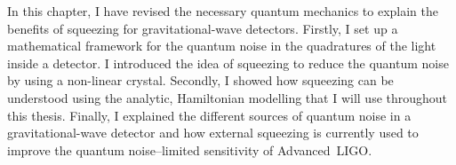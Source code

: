 In this chapter, I have revised the necessary quantum mechanics to explain the benefits of squeezing for gravitational-wave detectors. %
Firstly, I set up a mathematical framework for the quantum noise in the quadratures of the light inside a detector. I introduced the idea of squeezing to reduce the quantum noise by using a non-linear crystal.  %
Secondly, I showed how squeezing can be understood using the analytic, Hamiltonian modelling that I will use throughout this thesis. %
Finally, I explained the different sources of quantum noise in a gravitational-wave detector and how external squeezing is currently used to improve the quantum noise--limited sensitivity of Advanced~LIGO. %


